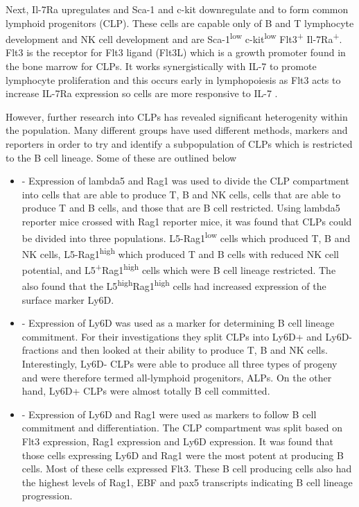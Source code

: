 Next, Il-7Ra upregulates and Sca-1 and c-kit downregulate and to form common lymphoid progenitors (CLP).
These cells are capable only of B and T lymphocyte development and NK cell development \citep{Kondo1997} and are Sca-1\textsuperscript{low} c-kit\textsuperscript{low} Flt3\textsuperscript{+} Il-7Ra\textsuperscript{+}.
Flt3 is the receptor for Flt3 ligand (Flt3L) which is a growth promoter found in the bone marrow for CLPs.
It works synergistically with IL-7 to promote lymphocyte proliferation and this occurs early in lymphopoiesis as Flt3 acts to increase IL-7Ra expression so cells are more responsive to IL-7 \citep{Holmes2006}.

However, further research into CLPs has revealed significant heterogenity within the population.
Many different groups have used different methods, markers and reporters in order to try and identify a subpopulation of CLPs which is restricted to the B cell lineage. 
Some of these are outlined below
\begin{itemize}
\item \citet{Mansson2010} - Expression of lambda5 and Rag1 was used to divide the CLP compartment into cells that are able to produce T, B and NK cells, cells that are able to produce T and B cells, and those that are B cell restricted.
Using lambda5 reporter mice crossed with Rag1 reporter mice, it was found that CLPs could be divided into three populations.
L5-Rag1\textsuperscript{low} cells which produced T, B and NK cells, L5-Rag1\textsuperscript{high} which produced T and B cells with reduced NK cell potential, and L5\textsuperscript{+}Rag1\textsuperscript{high} cells which were B cell lineage restricted.
The also found that the L5\textsuperscript{high}Rag1\textsuperscript{high} cells had increased expression of the surface marker Ly6D.
\item \citet{Inlay2009} - Expression of Ly6D was used as a marker for determining B cell lineage commitment.
For their investigations they split CLPs into Ly6D+ and Ly6D- fractions and then looked at their ability to produce T, B and NK cells.
Interestingly, Ly6D- CLPs were able to produce all three types of progeny and were therefore termed all-lymphoid progenitors, ALPs.
On the other hand, Ly6D+ CLPs were almost totally B cell committed.
\item \citet{Zhang2013} - Expression of Ly6D and Rag1 were used as markers to follow B cell commitment and differentiation.
The CLP compartment was split based on Flt3 expression, Rag1 expression and Ly6D expression.
It was found that those cells expressing Ly6D and Rag1 were the most potent at producing B cells. 
Most of these cells expressed Flt3.
These B cell producing cells also had the highest levels of Rag1, EBF and pax5 transcripts indicating B cell lineage progression.
\end{itemize}

